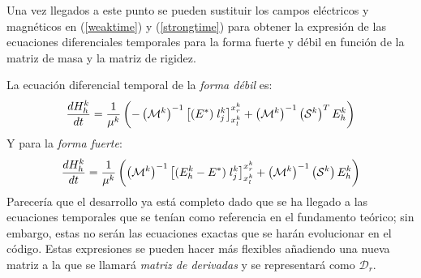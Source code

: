 \documentclass[11pt,a4paper,twoside,pdf]{article}
\numberwithin{equation}{section}
\begin{document}
Una vez llegados a este punto se pueden sustituir los campos eléctricos y magnéticos en (\ref{weaktime}) y (\ref{strongtime}) para obtener la expresión de las ecuaciones diferenciales temporales para la forma fuerte y débil en función de la matriz de masa y la matriz de rigidez. 

La ecuación diferencial temporal de la \textit{forma débil} es:
\begin{equation}
    \frac{dH_h^k}{dt}=\frac{1}{\mu^k}\left(-\left( \mathcal{M}^k \right)^{-1}\left[(E^*)\;l_j^k\right]^{x^k_r}_{x^k_l}+\left( \mathcal{M}^k \right)^{-1}\left(\mathcal{S}^k\right)^TE_h^k\right)\notag
\end{equation}
Y para la \textit{forma fuerte}:
\begin{equation}
\begin{split}
\frac{dH_h^k}{dt} = \frac{1}{\mu^k}\left(\left( \mathcal{M}^k \right)^{-1}  \left[(E^k_h-E^*)\;l_j^k\right]^{x^k_r}_{x^k_l} 
  +\left( \mathcal{M}^k \right)^{-1} \left(\mathcal{S}^k\right) E_h^k\right)
\end{split}\notag
\end{equation}
Parecería que el desarrollo ya está completo dado que se ha llegado a las ecuaciones temporales que se tenían como referencia en el fundamento teórico; sin embargo, estas no serán las ecuaciones exactas que se harán evolucionar en el código. Estas expresiones se pueden hacer más flexibles añadiendo una nueva matriz a la que se llamará \textit{matriz de derivadas} y se representará como $\mathcal{D}_r$.
\end{document}
